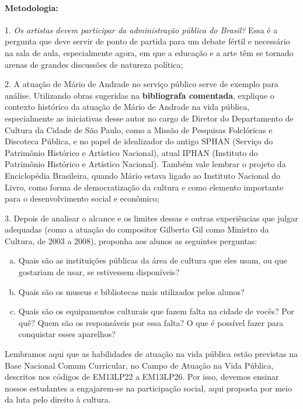 \documentclass[11pt]{extarticle}
\begin{document}
\paragraph{Metodologia:}

1. \textit{Os artistas devem participar da administração pública do Brasil?} Essa
é a pergunta que deve servir de ponto de partida para um debate fértil e
necessário na sala de aula, especialmente agora, em que a educação e a
arte têm se tornado arenas de grandes discussões de natureza política;

2. A atuação de Mário de Andrade no serviço público serve de exemplo
para análise. Utilizando obras sugeridas na \textbf{bibliografa
comentada}, explique o contexto histórico da atuação de Mário de Andrade
na vida pública, especialmente as iniciativas desse autor no cargo de
Diretor do Departamento de Cultura da Cidade de São Paulo, como a Missão
de Pesquisas Folclóricas e Discoteca Pública, e no papel de idealizador
do antigo SPHAN (Serviço do Patrimônio Histórico e Artístico Nacional),
atual IPHAN (Instituto do Patrimônio Histórico e Artístico Nacional).
Também vale lembrar o projeto da Enciclopédia Brasileira, quando Mário
estava ligado ao Instituto Nacional do Livro, como forma de
democratização da cultura e como elemento importante para o
desenvolvimento social e econômico;

3. Depois de analisar o alcance e os limites dessas e outras
experiências que julgar adequadas (como a atuação do compositor Gilberto
Gil como Ministro da Cultura, de 2003 a 2008), proponha aos alunos as
seguintes perguntas:

\begin{enumerate}[(a)]  

\item Quais são as instituições públicas da área de cultura que eles usam,
ou que gostariam de usar, se estivessem disponíveis?

\item Quais são os museus e bibliotecas mais utilizados pelos alunos?

\item Quais são os equipamentos culturais que fazem falta na cidade de
vocês? Por quê? Quem são os responsáveis por essa falta? O que é
possível fazer para conquistar esses aparelhos?

\end{enumerate} 


Lembramos aqui que as habilidades de atuação na vida pública estão
previstas na Base Nacional Comum Curricular, no Campo de Atuação na Vida
Pública, descritos nos códigos de EM13LP22 a EM13LP26. Por isso, devemos
ensinar nossos estudantes a engajarem-se na participação social, aqui
proposta por meio da luta pelo direito à cultura.
\end{document}
